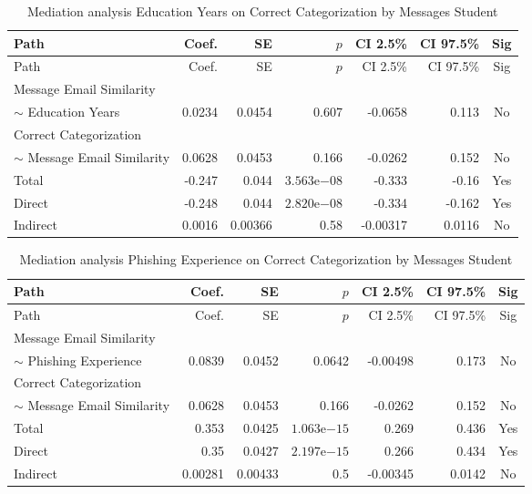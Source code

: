 \begin{longtable}{lrrrrrc}
            \caption{Mediation analysis Education Years on Correct Categorization by  Messages Student}\label{tab:mediation Education Years on Correct Categorization by  Messages Student}\\
            \toprule
            Path & Coef. & SE & $p$ & CI 2.5\% & CI 97.5\% & Sig \\
            \midrule
            \endfirsthead
            \toprule
            Path & Coef. & SE & $p$ & CI 2.5\% & CI 97.5\% & Sig \\
            \midrule
            \endhead
            \bottomrule
            \endfoot
            Message Email Similarity\\ $\sim$ Education Years & 0.0234 & 0.0454 & 0.607 & -0.0658 & 0.113 & No \\
Correct Categorization\\ $\sim$ Message Email Similarity & 0.0628 & 0.0453 & 0.166 & -0.0262 & 0.152 & No \\
Total & -0.247 & 0.044 & $3.563\mathrm{e}{-08}$ & -0.333 & -0.16 & Yes \\
Direct & -0.248 & 0.044 & $2.820\mathrm{e}{-08}$ & -0.334 & -0.162 & Yes \\
Indirect & 0.0016 & 0.00366 & 0.58 & -0.00317 & 0.0116 & No \\
\end{longtable}

\begin{longtable}{lrrrrrc}
            \caption{Mediation analysis Phishing Experience on Correct Categorization by  Messages Student}\label{tab:mediation Phishing Experience on Correct Categorization by  Messages Student}\\
            \toprule
            Path & Coef. & SE & $p$ & CI 2.5\% & CI 97.5\% & Sig \\
            \midrule
            \endfirsthead
            \toprule
            Path & Coef. & SE & $p$ & CI 2.5\% & CI 97.5\% & Sig \\
            \midrule
            \endhead
            \bottomrule
            \endfoot
            Message Email Similarity\\ $\sim$ Phishing Experience & 0.0839 & 0.0452 & 0.0642 & -0.00498 & 0.173 & No \\
Correct Categorization\\ $\sim$ Message Email Similarity & 0.0628 & 0.0453 & 0.166 & -0.0262 & 0.152 & No \\
Total & 0.353 & 0.0425 & $1.063\mathrm{e}{-15}$ & 0.269 & 0.436 & Yes \\
Direct & 0.35 & 0.0427 & $2.197\mathrm{e}{-15}$ & 0.266 & 0.434 & Yes \\
Indirect & 0.00281 & 0.00433 & 0.5 & -0.00345 & 0.0142 & No \\
\end{longtable}

